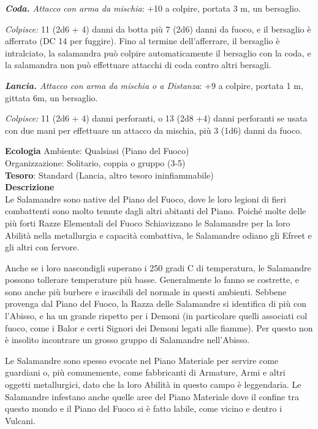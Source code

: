 \begin{multicols}{2}
\textit{\textbf{Coda.} Attacco con arma da mischia}: +10 a colpire, portata 3 m, un bersaglio.

\textit{Colpisce:} 11 (2d6 + 4) danni da botta più 7 (2d6) danni da fuoco, e il bersaglio è afferrato (DC 14 per fuggire). Fino al termine dell'afferrare, il bersaglio è intralciato, la salamandra può colpire automaticamente il bersaglio con la coda, e la salamandra non può effettuare attacchi di coda contro altri bersagli.

\textit{\textbf{Lancia.} Attacco con arma da mischia o a Distanza}: +9 a colpire, portata 1 m, gittata 6m, un bersaglio.

\textit{Colpisce:} 11 (2d6 + 4) danni perforanti, o 13 (2d8 +4) danni perforanti se usata con due mani per effettuare un attacco da mischia, più 3 (1d6) danni da fuoco.

\textbf{Ecologia}
Ambiente: Qualsiasi (Piano del Fuoco)\\
Organizzazione: Solitario, coppia o gruppo (3-5)\\
\textbf{Tesoro}: Standard (Lancia, altro tesoro ininfiammabile)\\
\textbf{Descrizione}\\
Le Salamandre sono native del Piano del Fuoco, dove le loro legioni di fieri combattenti sono molto temute dagli altri abitanti del Piano. Poiché molte delle più forti Razze Elementali del Fuoco Schiavizzano le Salamandre per la loro Abilità nella metallurgia e capacità combattiva, le Salamandre odiano gli Efreet e gli altri con fervore.

Anche se i loro nascondigli superano i 250 gradi C di temperatura, le Salamandre possono tollerare temperature più basse. Generalmente lo fanno se costrette, e sono anche più burbere e irascibili del normale in questi ambienti. Sebbene provenga dal Piano del Fuoco, la Razza delle Salamandre si identifica di più con l'Abisso, e ha un grande rispetto per i Demoni (in particolare quelli associati col fuoco, come i Balor e certi Signori dei Demoni legati alle fiamme). Per questo non è insolito incontrare un grosso gruppo di Salamandre nell'Abisso.

Le Salamandre sono spesso evocate nel Piano Materiale per servire come guardiani o, più comunemente, come fabbricanti di Armature, Armi e altri oggetti metallurgici, dato che la loro Abilità in questo campo è leggendaria. Le Salamandre infestano anche quelle aree del Piano Materiale dove il confine tra questo mondo e il Piano del Fuoco si è fatto labile, come vicino e dentro i Vulcani.


\end{multicols}
